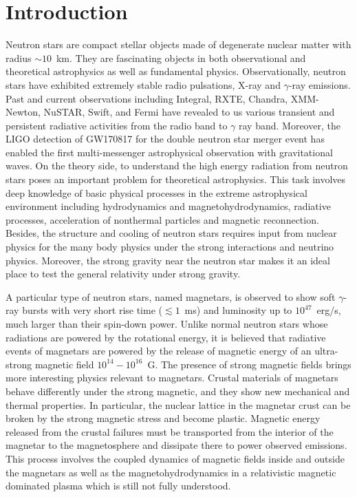 
\chapter{Introduction}
\label{chap:intro}

Neutron stars are compact stellar objects made of degenerate nuclear matter with radius $\sim 10$~km.
They are fascinating objects in both observational and theoretical astrophysics as well as fundamental physics.
Observationally, neutron stars have exhibited extremely stable radio pulsations, X-ray and $\gamma$-ray emissions. 
Past and current observations including Integral, RXTE, 
Chandra, 
XMM-Newton, 
NuSTAR, 
Swift, 
and Fermi
have revealed to us various transient and persistent radiative activities from the radio band to $\gamma$ ray band.
Moreover, the LIGO detection of GW170817 for the double neutron star merger event \citep{2017ApJ...848L..12A} has enabled the first multi-messenger astrophysical observation with gravitational waves.
On the theory side, to understand the high energy radiation from neutron stars poses an important problem for theoretical astrophysics.
This task involves deep knowledge of basic physical processes in the extreme astrophysical environment including hydrodynamics and magnetohydrodynamics, radiative processes, acceleration of nonthermal particles and magnetic reconnection.
Besides, the structure and cooling of neutron stars requires input from nuclear physics for the many body physics under the strong interactions and neutrino physics.
Moreover, the strong gravity near the neutron star makes it an ideal place to test the general relativity under strong gravity.

A particular type of neutron stars, named magnetars, is observed to show soft $\gamma$-ray bursts with very short rise time ($\lesssim 1$~ms) and luminosity up to $10^{47}$~erg/s, much larger than their spin-down power.
Unlike normal neutron stars whose radiations are powered by the rotational energy, it is believed that radiative events of magnetars are powered by the release of magnetic energy of an ultra-strong magnetic field $10^{14}-10^{16}$~G. 
The presence of strong magnetic fields brings more interesting physics relevant to magnetars.
Crustal materials of magnetars behave differently under the strong magnetic, and they show new mechanical and thermal properties. 
In particular, the nuclear lattice in the magnetar crust can be broken by the strong magnetic stress and become plastic.
Magnetic energy released from the crustal failures must be transported from the interior of the magnetar to the magnetosphere and dissipate there to power observed emissions.
This process involves the coupled dynamics of magnetic fields inside and outside the magnetars as well as the magnetohydrodynamics in a relativistic magnetic dominated plasma which is still not fully understood.

